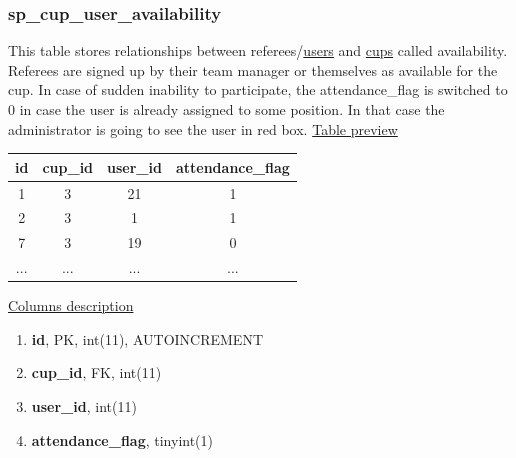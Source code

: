 \subsubsection*{sp\_cup\_user\_availability}
This table stores relationships between referees/\underline{users} and \underline{cups} called availability. Referees are signed up by their team manager or themselves as available for the cup. In case of sudden inability to participate, the attendance\_flag is switched to 0 in case the user is already assigned to some position. In that case the administrator is going to see the user in red box.
\newline
\underline{Table preview}
\begin{center}
 \begin{tabular}{||c c c c||} 
 \hline
 id & cup\_id & user\_id & attendance\_flag  \\ [0.5ex] 
 \hline\hline
 1 & 3 & 21 & 1 \\ 
 \hline
 2 & 3 & 1 & 1 \\ 
 \hline
 7 & 3 & 19 & 0 \\ 
 \hline
 ... & ... & ... & ...  \\ [1ex] 
 \hline
\end{tabular}
\end{center}
\underline{Columns description}
\begin{enumerate}
  \setlength\itemsep{0em}
  \item \textbf{id}, PK, int(11), AUTOINCREMENT
  \item \textbf{cup\_id}, FK, int(11)
  \item \textbf{user\_id}, int(11)
  \item \textbf{attendance\_flag}, tinyint(1)
\end{enumerate}

